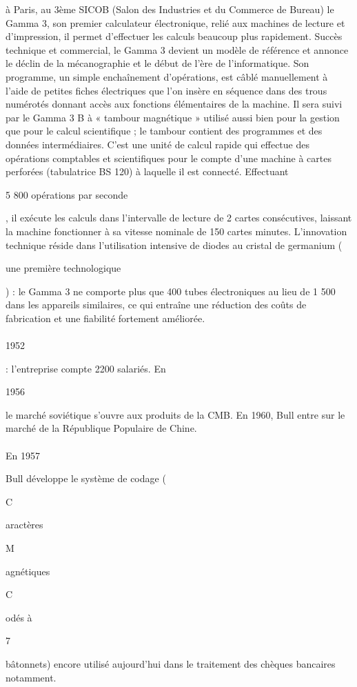 \documentclass[11pt]{article}
\begin{document}
		à Paris, au 3ème SICOB (Salon des Industries et du Commerce de Bureau) le Gamma 3, son premier calculateur électronique, 
		relié aux machines de lecture et d’impression, il permet d’effectuer les calculs beaucoup plus rapidement. 
		Succès technique et commercial, le Gamma 3 devient un modèle de référence et annonce le déclin de la mécanographie et 
		le début de l’ère de l’informatique. Son programme, un simple enchaînement d’opérations, est câblé manuellement à 
		l’aide de petites fiches électriques que l’on insère en séquence dans des trous numérotés donnant accès aux fonctions 
		élémentaires de la machine. Il sera suivi par le Gamma 3 B à « tambour magnétique » utilisé aussi bien pour la gestion 
		que pour le calcul scientifique ; le tambour contient des programmes et des données intermédiaires. C'est une unité de 
		calcul rapide qui effectue des opérations comptables et scientifiques pour le compte d'une machine à cartes perforées 
		(tabulatrice BS 120) à laquelle il est connecté. Effectuant \begin{bf}5 800 opérations par seconde\end{bf}, 
		il exécute les calculs dans l’intervalle de lecture de 2 cartes consécutives, laissant la machine fonctionner à sa 
		vitesse nominale de 150 cartes minutes. L'innovation technique réside dans l'utilisation intensive de diodes au 
		cristal de germanium (\begin{bf}une première technologique\end{bf}) : le Gamma 3 ne comporte plus que 400 tubes 
		électroniques au lieu de 1 500 dans les appareils similaires, ce qui entraîne une réduction des coûts de fabrication 
		et une fiabilité fortement améliorée.
		\paragraph{}
		\begin{bf}1952\end{bf}: l’entreprise compte 2200 salariés. En \begin{bf}1956\end{bf} le marché soviétique s'ouvre 
		aux produits de la CMB. En 1960, Bull entre sur le marché de la République Populaire de Chine.
		\paragraph{}
		\begin{bf}En 1957\end{bf} Bull développe le système de codage (\begin{bf}C\end{bf}aractères \begin{bf}M\end{bf}agnétiques 
		\begin{bf}C\end{bf}odés à \begin{bf}7\end{bf} bâtonnets) encore utilisé aujourd’hui dans le traitement des chèques 
		bancaires notamment.
\end{document}
